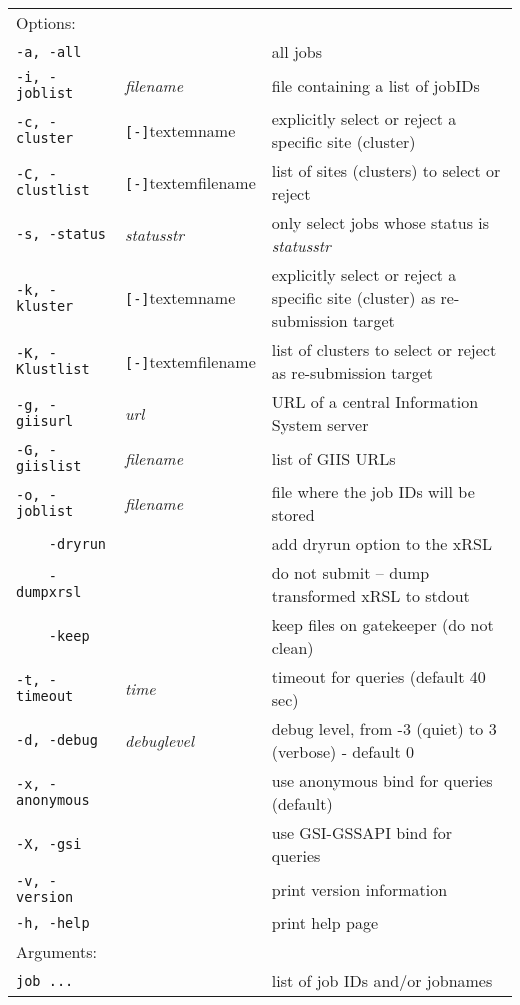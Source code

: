 \hspace*{0.5cm}
\begin{shaded}
\end{shaded}
\begin{longtable}{llp{8cm}}
   Options:&&\\
   \texttt{-a, -all}& & all jobs\\
   \texttt{-i, -joblist}& \textit{filename} & file containing a list of jobIDs\\
   \texttt{-c, -cluster}&\verb#[-]#textem{name}&explicitly select or reject a specific site (cluster)\\
   \texttt{-C, -clustlist}&\verb#[-]#textem{filename}&list of sites (clusters) to select or reject\\
   \texttt{-s, -status}& \textit{statusstr} &only select jobs whose status is \textit{statusstr}\\
   \texttt{-k, -kluster}&\verb#[-]#textem{name}&explicitly select or
   reject a specific site (cluster) as re-submission target\\
   \texttt{-K, -Klustlist}&\verb#[-]#textem{filename}&list of
   clusters to select or reject as re-submission target\\
   \texttt{-g, -giisurl}& \textit{url} &URL of a central Information System server\\
   \texttt{-G, -giislist}&\textit{filename}&list of GIIS URLs\\
   \texttt{-o, -joblist}&\textit{filename}&file where the job IDs will be stored\\
   \texttt{~~~~-dryrun}&&add dryrun option to the xRSL\\
   \texttt{~~~~-dumpxrsl}&&do not submit -- dump transformed xRSL to stdout\\
   \texttt{~~~~-keep}& & keep files on gatekeeper (do not clean)\\
   \texttt{-t, -timeout}& \textit{time} & timeout for queries (default 40 sec)\\
   \texttt{-d, -debug}& \textit{debuglevel} &debug level, from -3 (quiet) to 3 (verbose) - default 0\\
   \texttt{-x, -anonymous}& & use anonymous bind for queries (default)\\
   \texttt{-X, -gsi}& & use GSI-GSSAPI bind for queries\\
   \texttt{-v, -version}& & print version information\\
   \texttt{-h, -help}& & print help page\\
   Arguments:&&\\
   \texttt{job ...} && list of job IDs and/or jobnames\\
\end{longtable}


